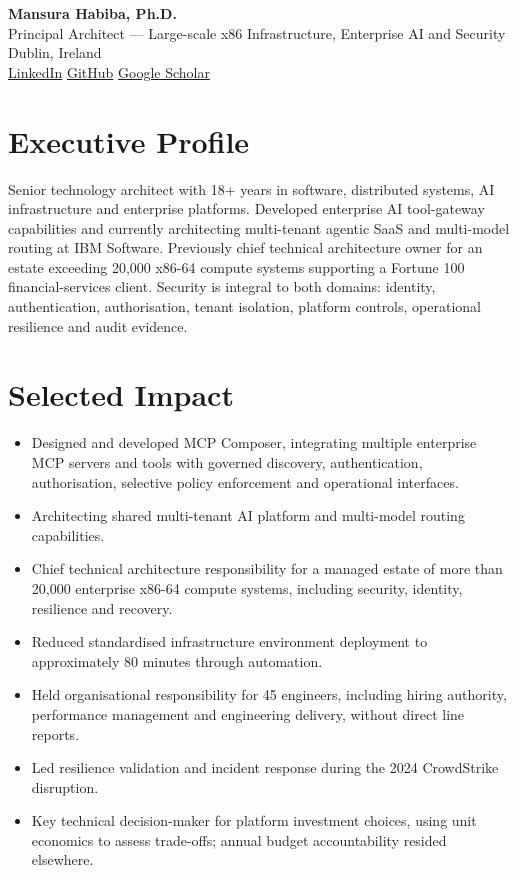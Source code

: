 \documentclass[11pt,a4paper]{article}
\begin{document}
\begin{center}
{\Huge\bfseries Mansura Habiba, Ph.D.}\\[4pt]
{\large Principal Architect --- Large-scale x86 Infrastructure, Enterprise AI and Security}\\
Dublin, Ireland\\
\href{https://www.linkedin.com/in/mansura-h-a0174a19}{LinkedIn} \quad \href{https://github.com/mansura-habiba}{GitHub} \quad \href{https://scholar.google.com/citations?user=oee3rpwAAAAJ}{Google Scholar}
\end{center}
\section*{Executive Profile}
Senior technology architect with 18+ years in software, distributed systems, AI infrastructure and enterprise platforms. Developed enterprise AI tool-gateway capabilities and currently architecting multi-tenant agentic SaaS and multi-model routing at IBM Software. Previously chief technical architecture owner for an estate exceeding 20,000 x86-64 compute systems supporting a Fortune 100 financial-services client. Security is integral to both domains: identity, authentication, authorisation, tenant isolation, platform controls, operational resilience and audit evidence.
\section*{Selected Impact}
\begin{itemize}
\item Designed and developed MCP Composer, integrating multiple enterprise MCP servers and tools with governed discovery, authentication, authorisation, selective policy enforcement and operational interfaces.
\item Architecting shared multi-tenant AI platform and multi-model routing capabilities.
\item Chief technical architecture responsibility for a managed estate of more than 20,000 enterprise x86-64 compute systems, including security, identity, resilience and recovery.
\item Reduced standardised infrastructure environment deployment to approximately 80 minutes through automation.
\item Held organisational responsibility for 45 engineers, including hiring authority, performance management and engineering delivery, without direct line reports.
\item Led resilience validation and incident response during the 2024 CrowdStrike disruption.
\item Key technical decision-maker for platform investment choices, using unit economics to assess trade-offs; annual budget accountability resided elsewhere.
\end{itemize}
\end{document}
